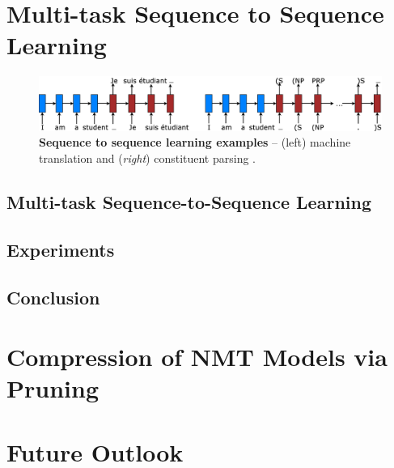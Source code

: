 
\section{Multi-task Sequence to Sequence Learning}

\begin{figure}%
\centering
\includegraphics[width=1\textwidth, clip=true, trim= 0 0 0
0]{img/6-1_seq2seq}
\caption{{\bf Sequence to sequence learning examples} -- (left) machine
translation \citep{sutskever14} and ({\it right}) constituent parsing
\citep{vinyals15grammar}.}
\label{f:s2s}
\end{figure}


\subsection{Multi-task Sequence-to-Sequence Learning}
\label{sec:multi}


\subsection{Experiments}
\label{sec:exp}


\subsection{Conclusion}
\label{sec:conclude}




\section{Compression of NMT Models via Pruning}

\section{Future Outlook}

